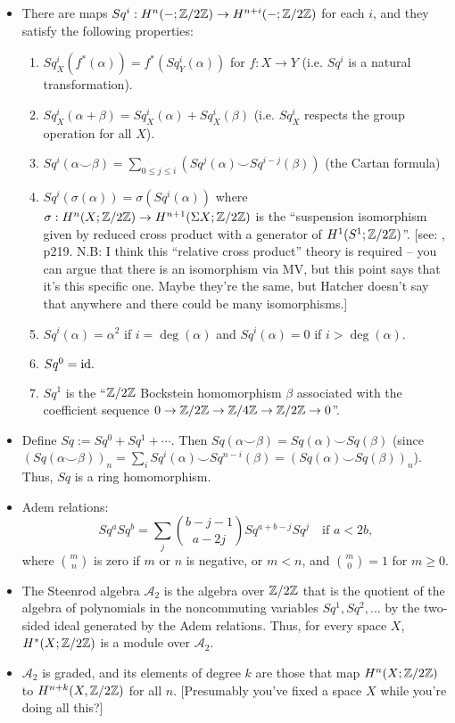 \documentclass{MetricNotes2023}
\def\inte{\ensuremath\mathbb{Z}}
\def\id{\ensuremath\text{id}}
\begin{document}
\begin{itemize}
\item There are maps \(Sq^i : H^n(-; \inte/2\inte)\to H^{n+i}(- ; \inte/2\inte)\) for each \(i\), and they satisfy the following properties: \begin{enumerate}
\item \(Sq^i_X(f^*(\alpha))=f^*(Sq^i_Y(\alpha))\) for \(f : X \to Y\) (i.e. \(Sq^i\) is a natural transformation).
\item \(Sq^i_X(\alpha + \beta)=Sq^i_X(\alpha)+Sq^i_X(\beta)\) (i.e. \(Sq_X^i\) respects the group operation for all \(X\)).
\item \(Sq^i(\alpha \smile \beta)=\sum\limits_{0\leq j \leq i} (Sq^j(\alpha)\smile Sq^{i-j}(\beta))\) (the Cartan formula)
\item \(Sq^i(\sigma(\alpha))=\sigma(Sq^i(\alpha))\) where \(\sigma : H^n(X; \inte/2\inte)\to H^{n+1}(\Sigma X; \inte/2\inte)\) is the ``suspension isomorphism given by reduced cross product with a generator of \(H^1(S^1; \inte/2\inte)\)''. [see: \autocite{hatcher}, p219. N.B: I think this ``relative cross product'' theory is required -- you can argue that there is an isomorphism via MV, but this point says that it's this specific one. Maybe they're the same, but Hatcher doesn't say that anywhere and there could be many isomorphisms.]
\item \(Sq^i(\alpha)=\alpha^2\) if \(i=\deg(\alpha)\) and \(Sq^i(\alpha)=0\) if \(i> \deg(\alpha)\). %
\item \(Sq^0=\id.\)
\item \(Sq^1\) is the ``\(\inte/2\inte\) Bockstein homomorphism \(\beta\) associated with the coefficient sequence \(0 \to \inte/2\inte \to \inte/4\inte \to \inte/2\inte \to 0\)''. 
\end{enumerate}
\item Define \(Sq:=Sq^0+Sq^1+\cdots\). Then \(Sq(\alpha\smile \beta)=Sq(\alpha)\smile Sq(\beta)\) (since \((Sq(\alpha\smile \beta))_n=\sum_iSq^i(\alpha)\smile Sq^{n-i}(\beta)=(Sq(\alpha)\smile Sq(\beta))_n\)). Thus, \(Sq\) is a ring homomorphism. 
\item Adem relations:
\[Sq^aSq^b=\sum_j {b-j-1\choose a-2j}Sq^{a+b-j}Sq^j \quad \text{if } a<2b,\]
where \({m \choose n}\) is zero if \(m\) or \(n\) is negative, or \(m<n\), and \({m \choose 0}=1\) for \(m \geq 0\).
\item The Steenrod algebra \(\mathscr{A}_2\) is the algebra over \(\inte/2\inte\) that is the quotient of the algebra of polynomials in the noncommuting variables \(Sq^1, Sq^2, ...\) by the two-sided ideal generated by the Adem relations. Thus, for every space \(X\), \(H^*(X; \inte/2\inte)\) is a module over \(\mathscr A_2\).
\item \(\mathscr A_2\) is graded, and its elements of degree \(k\) are those that map \(H^n(X; \inte/2\inte)\) to \(H^{n+k}(X, \inte/2\inte)\) for all \(n\). [Presumably you've fixed a space \(X\) while you're doing all this?]
\end{itemize}
\end{document}
